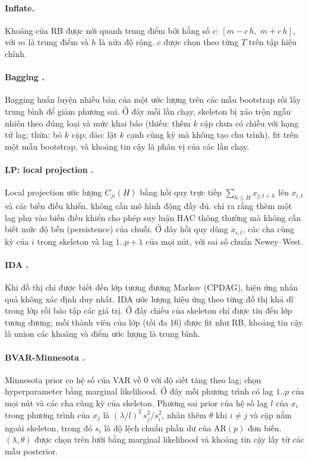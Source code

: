 \paragraph{Inflate.}
Khoảng của RB được nới quanh trung điểm bởi hằng số $c$: $[m-c\,h,\;m+c\,h]$, với $m$ là trung điểm và $h$ là nửa độ rộng. $c$ được chọn theo từng $T$ trên tập hiệu chỉnh.

\paragraph{Bagging \citep{breiman1996bagging}.}
Bagging huấn luyện nhiều bản của một ước lượng trên các mẫu bootstrap rồi lấy trung bình để giảm phương sai. Ở đây mỗi lần chạy, skeleton bị xáo trộn ngẫu nhiên theo đúng loại và mức khai báo (thiếu: thêm $k$ cặp chưa có chiều với hạng tử lag; thừa: bỏ $k$ cặp; đảo: lật $k$ cạnh cùng kỳ mà không tạo chu trình), fit trên một mẫu bootstrap, và khoảng tin cậy là phân vị của các lần chạy.

\paragraph{LP: local projection \citep{jorda2005estimation,montiel2021local}.}
Local projection ước lượng $C_{ji}(H)$ bằng hồi quy trực tiếp $\sum_{h\le H}x_{j,t+h}$ lên $x_{i,t}$ và các biến điều khiển, không cần mô hình động đầy đủ. \citet{montiel2021local} chỉ ra rằng thêm một lag phụ vào biến điều khiển cho phép suy luận HAC thông thường mà không cần biết mức độ bền (persistence) của chuỗi. Ở đây hồi quy dùng $x_{i,t}$, các cha cùng kỳ của $i$ trong skeleton và lag $1..p{+}1$ của mọi nút, với sai số chuẩn Newey--West.

\paragraph{IDA \citep{maathuis2009estimating}.}
Khi đồ thị chỉ được biết đến lớp tương đương Markov (CPDAG), hiệu ứng nhân quả không xác định duy nhất. IDA ước lượng hiệu ứng theo từng đồ thị khả dĩ trong lớp rồi báo tập các giá trị. Ở đây chiều của skeleton chỉ được tin đến lớp tương đương; mỗi thành viên của lớp (tối đa 16) được fit như RB, khoảng tin cậy là union các khoảng và điểm ước lượng là trung bình.

\paragraph{BVAR-Minnesota \citep{doan1984forecasting,litterman1986forecasting,giannone2015prior}.}
Minnesota prior co hệ số của VAR về 0 với độ siết tăng theo lag; \citet{giannone2015prior} chọn hyperparameter bằng marginal likelihood. Ở đây mỗi phương trình có lag $1..p$ của mọi nút và các cha cùng kỳ của skeleton. Phương sai prior của hệ số lag $l$ của $x_i$ trong phương trình của $x_j$ là $(\lambda/l)^2\,s_j^2/s_i^2$, nhân thêm $\theta$ khi $i\ne j$ và cặp nằm ngoài skeleton, trong đó $s_i$ là độ lệch chuẩn phần dư của AR$(p)$ đơn biến. $(\lambda,\theta)$ được chọn trên lưới bằng marginal likelihood và khoảng tin cậy lấy từ các mẫu posterior.

